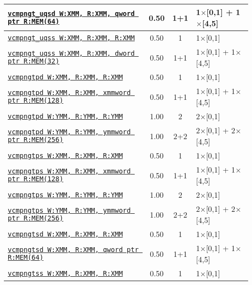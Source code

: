 \documentclass[a4paper,english,fontsize=9]{scrartcl}
\begin{document}
\begin{longtable}{p{}ccL{.25\textwidth}}
  \midrule
  \texttt{\href{https://felixcloutier.com/x86/CMPSD.html}{vcmpngt\_uqsd W:XMM, R:XMM, qword ptr R:MEM(64)}} & 0.50 & 1+1 & 1\(\times\)[0,1] + 1\(\times\)[4,5] \\
  \midrule
  \texttt{\href{https://felixcloutier.com/x86/CMPSS.html}{vcmpngt\_uqss W:XMM, R:XMM, R:XMM}} & 0.50 & 1 & 1\(\times\)[0,1] \\
  \midrule
  \texttt{\href{https://felixcloutier.com/x86/CMPSS.html}{vcmpngt\_uqss W:XMM, R:XMM, dword ptr R:MEM(32)}} & 0.50 & 1+1 & 1\(\times\)[0,1] + 1\(\times\)[4,5] \\
  \midrule
  \texttt{\href{https://felixcloutier.com/x86/CMPPD.html}{vcmpngtpd W:XMM, R:XMM, R:XMM}} & 0.50 & 1 & 1\(\times\)[0,1] \\
  \midrule
  \texttt{\href{https://felixcloutier.com/x86/CMPPD.html}{vcmpngtpd W:XMM, R:XMM, xmmword ptr R:MEM(128)}} & 0.50 & 1+1 & 1\(\times\)[0,1] + 1\(\times\)[4,5] \\
  \midrule
  \texttt{\href{https://felixcloutier.com/x86/CMPPD.html}{vcmpngtpd W:YMM, R:YMM, R:YMM}} & 1.00 & 2 & 2\(\times\)[0,1] \\
  \midrule
  \texttt{\href{https://felixcloutier.com/x86/CMPPD.html}{vcmpngtpd W:YMM, R:YMM, ymmword ptr R:MEM(256)}} & 1.00 & 2+2 & 2\(\times\)[0,1] + 2\(\times\)[4,5] \\
  \midrule
  \texttt{\href{https://felixcloutier.com/x86/CMPPS.html}{vcmpngtps W:XMM, R:XMM, R:XMM}} & 0.50 & 1 & 1\(\times\)[0,1] \\
  \midrule
  \texttt{\href{https://felixcloutier.com/x86/CMPPS.html}{vcmpngtps W:XMM, R:XMM, xmmword ptr R:MEM(128)}} & 0.50 & 1+1 & 1\(\times\)[0,1] + 1\(\times\)[4,5] \\
  \midrule
  \texttt{\href{https://felixcloutier.com/x86/CMPPS.html}{vcmpngtps W:YMM, R:YMM, R:YMM}} & 1.00 & 2 & 2\(\times\)[0,1] \\
  \midrule
  \texttt{\href{https://felixcloutier.com/x86/CMPPS.html}{vcmpngtps W:YMM, R:YMM, ymmword ptr R:MEM(256)}} & 1.00 & 2+2 & 2\(\times\)[0,1] + 2\(\times\)[4,5] \\
  \midrule
  \texttt{\href{https://felixcloutier.com/x86/CMPSD.html}{vcmpngtsd W:XMM, R:XMM, R:XMM}} & 0.50 & 1 & 1\(\times\)[0,1] \\
  \midrule
  \texttt{\href{https://felixcloutier.com/x86/CMPSD.html}{vcmpngtsd W:XMM, R:XMM, qword ptr R:MEM(64)}} & 0.50 & 1+1 & 1\(\times\)[0,1] + 1\(\times\)[4,5] \\
  \midrule
  \texttt{\href{https://felixcloutier.com/x86/CMPSS.html}{vcmpngtss W:XMM, R:XMM, R:XMM}} & 0.50 & 1 & 1\(\times\)[0,1] \\

\end{longtable}
\end{document}
